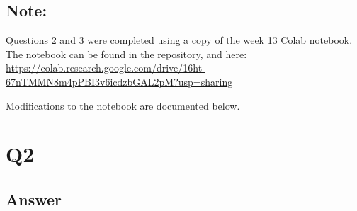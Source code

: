 \documentclass[12pt]{article}
\begin{document}
\subsection*{Note:}
Questions 2 and 3 were completed using a copy of the week 13 Colab notebook.  The notebook can be found in the repository, and here: \url{https://colab.research.google.com/drive/16ht-67nTMMN8m4pPBI3v6icdzbGAL2pM?usp=sharing}

Modifications to the notebook are documented below.

\section*{Q2}

\subsection*{Answer}
\end{document}

